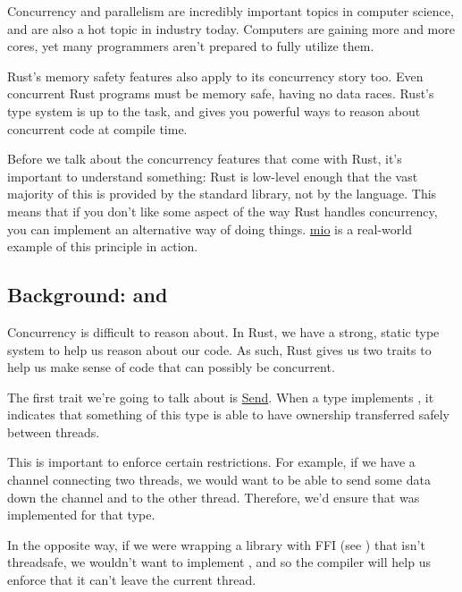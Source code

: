 Concurrency and parallelism are incredibly important topics in computer science, and are also a hot topic in industry today. 
Computers are gaining more and more cores, yet many programmers aren't prepared to fully utilize them.

\blank

Rust's memory safety features also apply to its concurrency story too. Even concurrent Rust programs must be memory safe, having 
no data races. Rust's type system is up to the task, and gives you powerful ways to reason about concurrent code at compile time.

\blank

Before we talk about the concurrency features that come with Rust, it's important to understand something: Rust is low-level enough 
that the vast majority of this is provided by the standard library, not by the language. This means that if you don't like some aspect 
of the way Rust handles concurrency, you can implement an alternative way of doing things. \href{https://github.com/carllerche/mio}{mio} 
is a real-world example of this principle in action.

\subsection*{Background:  and }

Concurrency is difficult to reason about. In Rust, we have a strong, static type system to help us reason about our code. As such, 
Rust gives us two traits to help us make sense of code that can possibly be concurrent.


The first trait we're going to talk about is \href{https://doc.rust-lang.org/std/marker/trait.Send.html}{Send}. When a type  
implements , it indicates that something of this type is able to have ownership transferred safely between threads.

\blank

This is important to enforce certain restrictions. For example, if we have a channel connecting two threads, we would want to be 
able to send some data down the channel and to the other thread. Therefore, we'd ensure that  was implemented for that type.

\blank

In the opposite way, if we were wrapping a library with FFI (see ) that isn't threadsafe, we wouldn't want to 
implement , and so the compiler will help us enforce that it can't leave the current thread.

